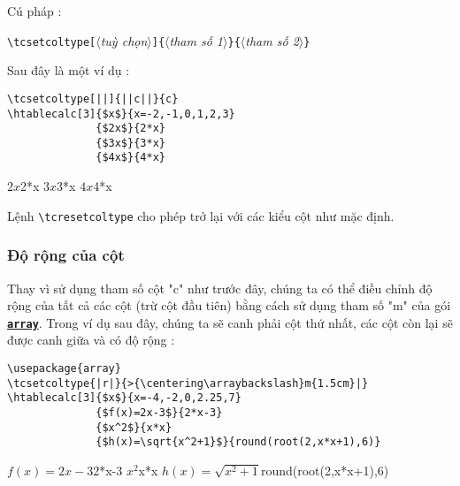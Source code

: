 \documentclass[a4paper,10pt]{article}
\newcommand\argu[1]{$\langle$\textit{#1}$\rangle$}
\newcommand\ARGU[1]{\texttt{\{}\argu{#1}\texttt{\}}}
\newcommand\arguC[1]{\texttt{[}\argu{#1}\texttt{]}}
\newcommand\verbinline{\lstinline[breaklines=false,basicstyle=\normalsize\ttfamily]}
\newcommand\mywidth{0.85\linewidth}
\begin{document}
Cú pháp :\par\nobreak
\verbinline|\tcsetcoltype|\arguC{tuỳ chọn}\ARGU{tham số 1}\ARGU{tham số 2}\medskip

Sau đây là một ví dụ :
\begin{center}
\begin{minipage}{\mywidth}
\begin{lstlisting}
\tcsetcoltype[||]{||c||}{c}
\htablecalc[3]{$x$}{x=-2,-1,0,1,2,3}
              {$2x$}{2*x}
              {$3x$}{3*x}
              {$4x$}{4*x}
\end{lstlisting}
\end{minipage}

              {$2x$}{2*x}
              {$3x$}{3*x}
              {$4x$}{4*x}
\end{center}

Lệnh \verbinline|\tcresetcoltype| cho phép trở lại với các kiểu cột như mặc định.

\subsubsection{Độ rộng của cột}
Thay vì sử dụng tham số cột "c" như trước đây, chúng ta có thể điều chỉnh độ rộng của tất cả các cột (trừ cột đầu tiên) bằng cách sử dụng tham số "m" của gói \href{http://www.ctan.org/tex-archive/graphics/pgf/base/latex/pgf/basiclayer/}{\texttt{\textbf{array}}}. Trong ví dụ sau đây, chúng ta sẽ canh phải cột thứ nhất, các cột còn lại sẽ được canh giữa và có độ rộng  :
\begin{center}
\begin{minipage}{\mywidth}
\begin{lstlisting}
\usepackage{array}
\tcsetcoltype{|r|}{>{\centering\arraybackslash}m{1.5cm}|}
\htablecalc[3]{$x$}{x=-4,-2,0,2.25,7}
              {$f(x)=2x-3$}{2*x-3}
              {$x^2$}{x*x}
              {$h(x)=\sqrt{x^2+1}$}{round(root(2,x*x+1),6)}
\end{lstlisting}
\end{minipage}

              {$f(x)=2x-3$}{2*x-3}
              {$x^2$}{x*x}
              {$h(x)=\sqrt{x^2+1}$}{round(root(2,x*x+1),6)}
\end{center}
\end{document}
